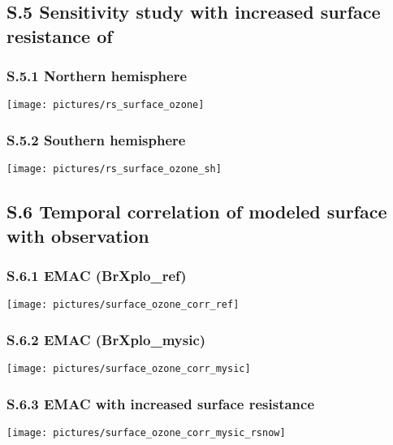 \documentclass[manuscript]{copernicus}
\begin{document}
\subsection*{S.5 Sensitivity study with increased surface resistance of }
\subsubsection*{S.5.1 Northern hemisphere}
\begin{center}
\texttt{[image: pictures/rs\_surface\_ozone]}
\end{center}
%
\subsubsection*{S.5.2 Southern hemisphere}
\begin{center}
\texttt{[image: pictures/rs\_surface\_ozone\_sh]}
\end{center}
%
\subsection*{S.6 Temporal correlation of modeled surface  with observation}
\subsubsection*{S.6.1 EMAC (BrXplo\_ref)}
\begin{center}
\texttt{[image: pictures/surface\_ozone\_corr\_ref]}
\end{center}
%
\subsubsection*{S.6.2 EMAC (BrXplo\_mysic)}
\begin{center}
\texttt{[image: pictures/surface\_ozone\_corr\_mysic]}
\end{center}
%
\subsubsection*{S.6.3 EMAC with increased surface resistance}
\begin{center}
\texttt{[image: pictures/surface\_ozone\_corr\_mysic\_rsnow]}
\end{center}
\end{document}
